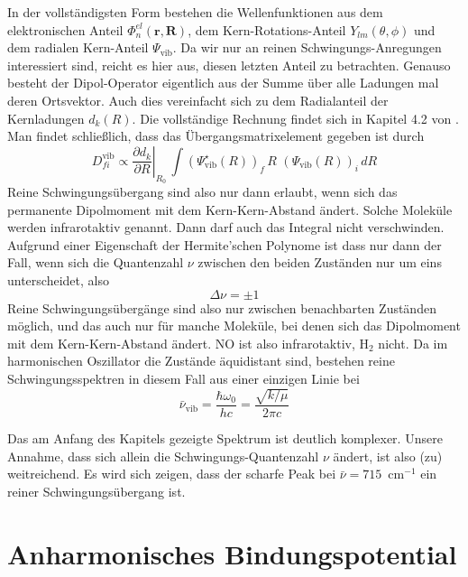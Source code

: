 In der vollständigsten Form bestehen die Wellenfunktionen aus dem elektronischen Anteil $ \Phi_n^{el}  (\mathbf{r}, \mathbf{R})  $, dem Kern-Rotations-Anteil $ Y_{l m} (\theta, \phi)$ und dem radialen Kern-Anteil  $\Psi_\text{vib}$. Da wir nur an reinen Schwingungs-Anregungen interessiert sind, reicht es hier aus, diesen letzten Anteil zu betrachten. Genauso besteht der Dipol-Operator eigentlich aus der Summe über alle Ladungen mal deren Ortsvektor. Auch dies vereinfacht sich zu dem Radialanteil der Kernladungen $d_k(R)$. Die vollständige Rechnung findet sich in Kapitel 4.2 von \cite{Demtröder_molekuelphysik}. Man findet schließlich, dass das Übergangsmatrixelement gegeben ist durch
\begin{equation}
D_{fi}^\text{vib} \propto  \left. \frac{\partial d_k}{\partial R} \right|_{R_0} \,  \int (\Psi_\text{vib}^\star (R) )_f \, R  \, \, (\Psi_\text{vib} (R) )_i \, dR
\end{equation}
Reine Schwingungsübergang sind also nur dann erlaubt, wenn sich das permanente Dipolmoment mit dem Kern-Kern-Abstand ändert. Solche Moleküle werden infrarotaktiv genannt. Dann  darf auch das Integral nicht verschwinden. Aufgrund einer Eigenschaft der Hermite'schen Polynome ist dass nur dann der Fall, wenn sich die Quantenzahl $\nu$ zwischen den beiden Zuständen nur um eins unterscheidet, also 
\begin{equation}
 \Delta \nu = \pm 1
\end{equation}
Reine Schwingungsübergänge sind also nur zwischen benachbarten Zuständen möglich, und das auch nur für manche Moleküle, bei denen sich das Dipolmoment mit dem Kern-Kern-Abstand ändert. NO ist also infrarotaktiv, H$_2$ nicht. Da im harmonischen Oszillator die Zustände äquidistant sind, bestehen reine Schwingungsspektren in diesem Fall aus einer einzigen Linie bei 
\begin{equation}
 \bar{\nu}_\text{vib} = \frac{\hbar \omega_0}{h c} = \frac{\sqrt{k / \mu} }{2 \pi  c}
\end{equation}

Das am Anfang des Kapitels gezeigte Spektrum ist deutlich komplexer. Unsere Annahme, dass sich allein die Schwingungs-Quantenzahl $\nu$ ändert, ist also (zu) weitreichend. Es wird sich zeigen, dass der scharfe Peak bei $\bar{\nu} = 715$~cm$^{-1}$ ein reiner Schwingungsübergang ist.

\section{Anharmonisches Bindungspotential}

